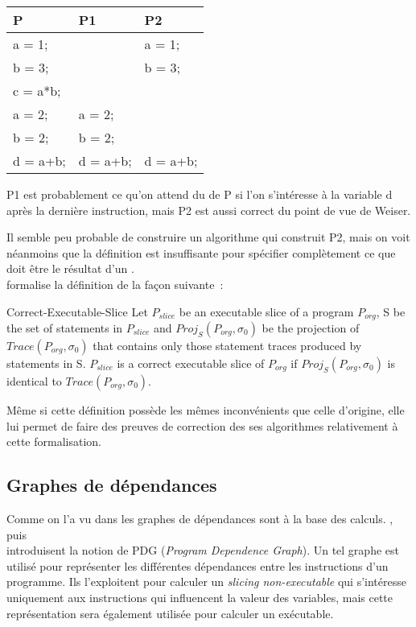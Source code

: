 \begin{exemple}
\begin{center}
\begin{tabular}{|l|l|l|}
\hline
P & P1 & P2 \\
\hline
a = 1;   &          & a = 1; \\
b = 3;   &          & b = 3; \\
c = a*b; &          & \\
a = 2;   & a = 2;   & \\
b = 2;   & b = 2;   & \\
d = a+b; & d = a+b; & d = a+b; \\
\hline
\end{tabular}
\end{center}
P1 est probablement ce qu'on attend du \slicing de P si l'on s'intéresse
à la variable d après la dernière instruction, mais P2
est aussi correct du point de vue de Weiser.
\end{exemple}

Il semble peu probable de construire un algorithme qui construit P2,
mais on voit néanmoins que la définition est insuffisante
pour spécifier complètement ce que doit être le résultat d'un \slicing.\\

\cite{Choi94} formalise la définition de la façon suivante~:

\begin{definition}{Correct-Executable-Slice}
Let $P_{slice}$ be an executable slice of a program $P_{org}$,
S be the set of statements in $P_{slice}$ and $Proj_S(P_{org}, \sigma_0)$
be the projection of $Trace(P_{org}, \sigma_0)$ that contains
only those statement traces produced by statements in S.
$P_{slice}$ is a correct executable slice of $P_{org}$ if
 $Proj_S(P_{org}, \sigma_0)$  is identical to $Trace(P_{org}, \sigma_0)$.
\end{definition}

Même si cette définition possède les mêmes inconvénients que celle d'origine,
elle lui permet de faire des preuves de correction des ses algorithmes
relativement à cette formalisation.

\subsection{Graphes de dépendances}

Comme on l'a vu dans \cite{ppcPdg} les graphes de dépendances sont à la base des
calculs.
\cite{Ottenstein84}, puis \\
\cite{Ferrante87}
introduisent la notion de PDG ({\it Program Dependence Graph}).
Un tel graphe est utilisé pour représenter les différentes dépendances
entre les instructions d'un programme.
Ils l'exploitent pour calculer un {\it slicing non-executable}
qui s'intéresse uniquement aux instructions
qui influencent la valeur des variables,
mais cette représentation sera également utilisée pour calculer un
\slicing exécutable.\\

